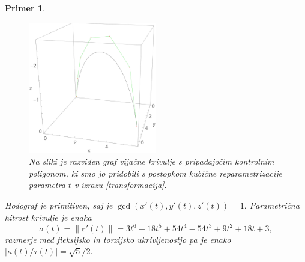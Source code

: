 \documentclass[12pt,a4paper,twoside]{article}
\theoremstyle{definition} %
\theoremstyle{plain} %
\theoremstyle{primerstyle}
\newtheorem{primer}[definicija]{Primer}
\numberwithin{equation}{section}  %
\newcommand{\rV}{\mathbf{r}}
\begin{document}
\begin{primer}
\begin{figure}[h!]
	  \includegraphics[width=0.5\textwidth]{images/cubic_reparametrization.pdf}
	  \caption[Primer vijačne krivulje, pridobljene s kubično reparametrizacijo]{Na sliki je razviden graf vijačne krivulje s pripadajočim kontrolnim poligonom, ki smo jo pridobili s postopkom kubične reparametrizacije parametra $t$ v izrazu \eqref{transformacija}.}
	  \label{fig:cubic_reparametrization}
	\end{figure}
	
	Hodograf je primitiven, saj je $\gcd(x'(t),y'(t),z'(t))=1.$ Parametrična hitrost krivulje je enaka $$\sigma(t)=\lVert\rV'(t)\rVert=3t^6-18t^5+54t^4-54t^3+9t^2+18t+3,$$ razmerje med fleksijsko in torzijsko ukrivljenostjo pa je enako $|\kappa(t)/\tau(t)|=\sqrt{5}/2.$
\end{primer}
\end{document}
